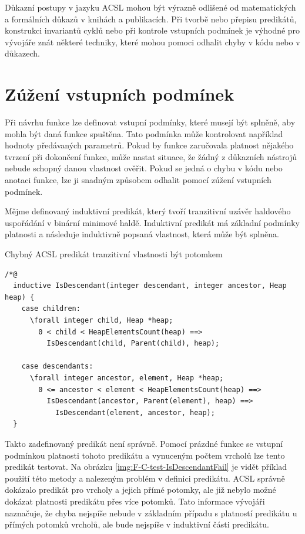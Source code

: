 Důkazní postupy v jazyku ACSL mohou být výrazně odlišené od matematických a formálních důkazů v knihách a publikacích. Při tvorbě nebo přepisu predikátů, konstrukci invariantů cyklů nebo při kontrole vstupních podmínek je výhodné pro vývojáře znát některé techniky, které mohou pomoci odhalit chyby v kódu nebo v důkazech. 

\section{Zúžení vstupních podmínek}

Při návrhu funkce lze definovat vstupní podmínky, které musejí být splněně, aby mohla být daná funkce spuštěna. Tato podmínka může kontrolovat například hodnoty předávaných parametrů. Pokud by funkce zaručovala platnost nějakého tvrzení při dokončení funkce, může nastat situace, že žádný z důkazních nástrojů nebude schopný danou vlastnost ověřit. Pokud se jedná o chybu v kódu nebo anotaci funkce, lze ji snadným způsobem odhalit pomocí zúžení vstupních podmínek.

Mějme definovaný induktivní predikát, který tvoří tranzitivní uzávěr haldového uspořádání v binární minimové haldě. Induktivní predikát má základní podmínky platnosti a následuje induktivně popsaná vlastnost, která může být splněna.

\begin{listing}[H]
	\caption{Chybný ACSL predikát tranzitivní vlastnosti být potomkem}
	\label{acsl:IsDescendantFail}
	\begin{verbatim}
/*@
  inductive IsDescendant(integer descendant, integer ancestor, Heap heap) {
    case children:
      \forall integer child, Heap *heap;
        0 < child < HeapElementsCount(heap) ==>
          IsDescendant(child, Parent(child), heap);

    case descendants:
      \forall integer ancestor, element, Heap *heap;
        0 <= ancestor < element < HeapElementsCount(heap) ==>
          IsDescendant(ancestor, Parent(element), heap) ==> 
            IsDescendant(element, ancestor, heap);
  }
    \end{verbatim}
\end{listing}

Takto zadefinovaný predikát není správně. Pomocí prázdné funkce se vstupní podmínkou platnosti tohoto predikátu a vynuceným počtem vrcholů lze tento predikát testovat. Na obrázku \ref{img:F-C-test-IsDescendantFail} je vidět příklad použití této metody a nalezeným problém v definici predikátu. ACSL správně dokázalo predikát pro vrcholy a jejich přímé potomky, ale již nebylo možné dokázat platnosti predikátu přes více potomků. Tato informace vývojáři naznačuje, že chyba nejspíše nebude v základním případu s platností predikátu u přímých potomků vrcholů, ale bude nejspíše v induktivní části predikátu.

